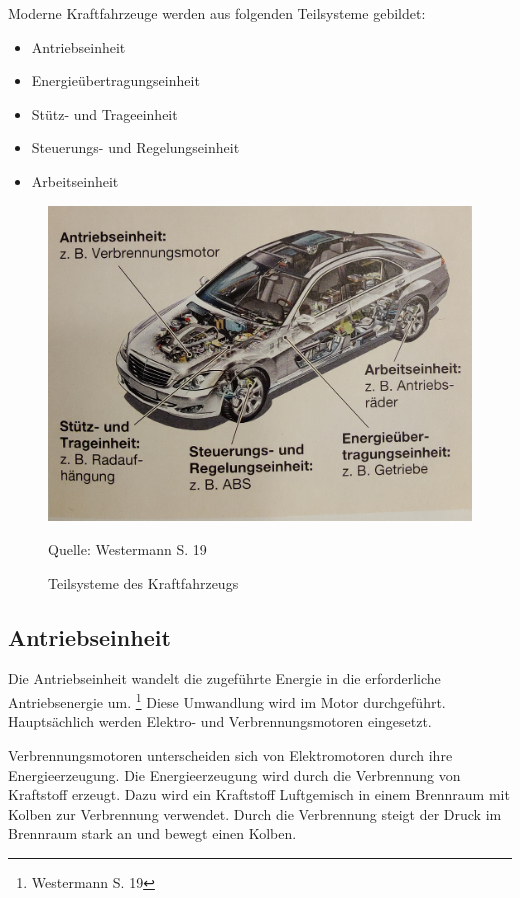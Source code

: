 Moderne Kraftfahrzeuge werden aus folgenden Teilsysteme gebildet:
\begin{itemize}
	\item Antriebseinheit
	\item Energieübertragungseinheit
	\item Stütz- und Trageeinheit
	\item Steuerungs- und Regelungseinheit
	\item Arbeitseinheit
\end{itemize}


\begin{figure}[h!]
	\caption{Teilsysteme des Kraftfahrzeugs}
	\includegraphics[scale=0.1]{assets/figures/Teilsysteme des Kraftfahrzeugs.jpg}
	\begin{flushleft}
		Quelle: Westermann S. 19
	\end{flushleft}
	\label{fig:birds}
\end{figure}


\subsection{Antriebseinheit}
Die Antriebseinheit wandelt die zugeführte Energie in die erforderliche Antriebsenergie um.
\footnote{Westermann S. 19}
Diese Umwandlung wird im Motor durchgeführt.
Hauptsächlich werden Elektro- und Verbrennungsmotoren eingesetzt.

Verbrennungsmotoren unterscheiden sich von Elektromotoren durch ihre Energieerzeugung.
Die Energieerzeugung wird durch die Verbrennung von Kraftstoff erzeugt.
Dazu wird ein Kraftstoff Luftgemisch in einem Brennraum mit Kolben zur Verbrennung verwendet.
Durch die Verbrennung steigt der Druck im Brennraum stark an und bewegt einen Kolben.

